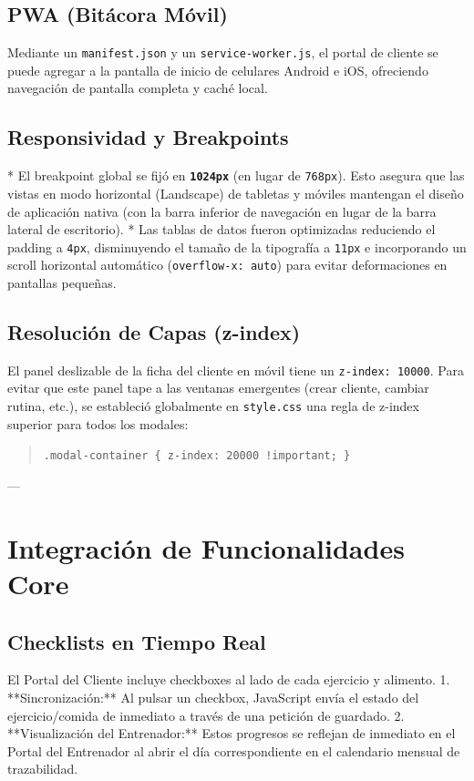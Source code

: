 \documentclass[11pt]{article}
\begin{document}
\subsection{PWA (Bitácora Móvil)}
Mediante un \texttt{manifest.json} y un \texttt{service-worker.js}, el portal de cliente se puede agregar a la pantalla de inicio de celulares Android e iOS, ofreciendo navegación de pantalla completa y caché local.

\subsection{Responsividad y Breakpoints}
*   El breakpoint global se fijó en \textbf{\texttt{1024px}} (en lugar de \texttt{768px}). Esto asegura que las vistas en modo horizontal (Landscape) de tabletas y móviles mantengan el diseño de aplicación nativa (con la barra inferior de navegación en lugar de la barra lateral de escritorio).
*   Las tablas de datos fueron optimizadas reduciendo el padding a \texttt{4px}, disminuyendo el tamaño de la tipografía a \texttt{11px} e incorporando un scroll horizontal automático (\texttt{overflow-x: auto}) para evitar deformaciones en pantallas pequeñas.

\subsection{Resolución de Capas (z-index)}
El panel deslizable de la ficha del cliente en móvil tiene un \texttt{z-index: 10000}. Para evitar que este panel tape a las ventanas emergentes (crear cliente, cambiar rutina, etc.), se estableció globalmente en \texttt{style.css} una regla de z-index superior para todos los modales:
\begin{quote}\footnotesize
    \texttt{.modal-container \{ z-index: 20000 !important; \}}
\end{quote}

---

\section{Integración de Funcionalidades Core}

\subsection{Checklists en Tiempo Real}
El Portal del Cliente incluye checkboxes al lado de cada ejercicio y alimento.
1.  **Sincronización:** Al pulsar un checkbox, JavaScript envía el estado del ejercicio/comida de inmediato a través de una petición de guardado.
2.  **Visualización del Entrenador:** Estos progresos se reflejan de inmediato en el Portal del Entrenador al abrir el día correspondiente en el calendario mensual de trazabilidad.
\end{document}
